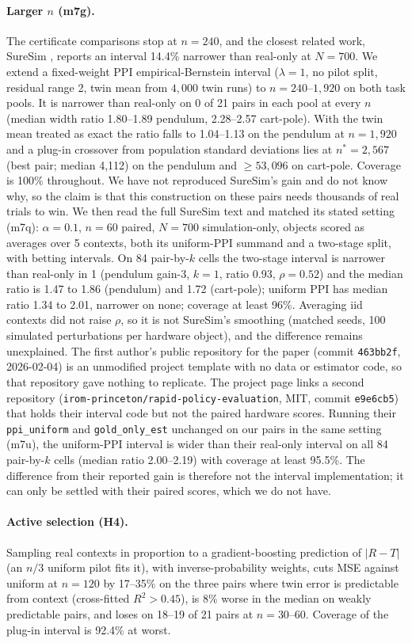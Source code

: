 \documentclass[11pt]{article}
\begin{document}
\paragraph{Larger $n$ (m7g).} The certificate comparisons stop at $n=240$, and the closest related work, SureSim \cite{badithela2025suresim}, reports an interval 14.4\% narrower than real-only at $N=700$. We extend a fixed-weight PPI empirical-Bernstein interval ($\lambda=1$, no pilot split, residual range 2, twin mean from $4{,}000$ twin runs) to $n=240$--$1{,}920$ on both task pools. It is narrower than real-only on 0 of 21 pairs in each pool at every $n$ (median width ratio 1.80--1.89 pendulum, 2.28--2.57 cart-pole). With the twin mean treated as exact the ratio falls to 1.04--1.13 on the pendulum at $n=1{,}920$ and a plug-in crossover from population standard deviations lies at $n^*=2{,}567$ (best pair; median 4{,}112) on the pendulum and $\ge 53{,}096$ on cart-pole. Coverage is 100\% throughout. We have not reproduced SureSim's gain and do not know why, so the claim is that this construction on these pairs needs thousands of real trials to win. We then read the full SureSim text and matched its stated setting (m7q): $\alpha=0.1$, $n=60$ paired, $N=700$ simulation-only, objects scored as averages over 5 contexts, both its uniform-PPI summand and a two-stage split, with betting intervals. On 84 pair-by-$k$ cells the two-stage interval is narrower than real-only in 1 (pendulum gain-3, $k=1$, ratio 0.93, $\rho=0.52$) and the median ratio is 1.47 to 1.86 (pendulum) and 1.72 (cart-pole); uniform PPI has median ratio 1.34 to 2.01, narrower on none; coverage at least 96\%. Averaging iid contexts did not raise $\rho$, so it is not SureSim's smoothing (matched seeds, 100 simulated perturbations per hardware object), and the difference remains unexplained. The first author's public repository for the paper (commit \texttt{463bb2f}, 2026-02-04) is an unmodified project template with no data or estimator code, so that repository gave nothing to replicate. The project page links a second repository (\texttt{irom-princeton/rapid-policy-evaluation}, MIT, commit \texttt{e9e6cb5}) that holds their interval code but not the paired hardware scores. Running their \texttt{ppi\_uniform} and \texttt{gold\_only\_est} unchanged on our pairs in the same setting (m7u), the uniform-PPI interval is wider than their real-only interval on all 84 pair-by-$k$ cells (median ratio 2.00--2.19) with coverage at least 95.5\%. The difference from their reported gain is therefore not the interval implementation; it can only be settled with their paired scores, which we do not have.

\paragraph{Active selection (H4).} Sampling real contexts in proportion to a gradient-boosting prediction of $|R-T|$ (an $n/3$ uniform pilot fits it), with inverse-probability weights, cuts MSE against uniform at $n=120$ by 17--35\% on the three pairs where twin error is predictable from context (cross-fitted $R^2>0.45$), is 8\% worse in the median on weakly predictable pairs, and loses on 18--19 of 21 pairs at $n=30$--60. Coverage of the plug-in interval is 92.4\% at worst.


\end{document}
